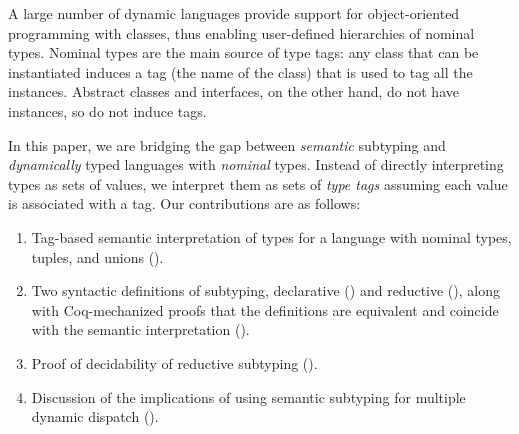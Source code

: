 A large number of dynamic languages provide support 
for object-oriented programming with classes, 
thus enabling user-defined hierarchies of nominal types.
Nominal types are the main source of type tags: 
any class that can be instantiated induces a tag (the name of the class) 
that is used to tag all the instances.
Abstract classes and interfaces, on the other hand, 
do not have instances, so do not induce tags.

In this paper, we are bridging the gap between \emph{semantic} subtyping 
and \emph{dynamically} typed languages with \emph{nominal} types.
Instead of directly interpreting types as sets of values,
we interpret them as sets of \emph{type tags} assuming 
each value is associated with a tag.
Our contributions are as follows:
\begin{enumerate}
  \item Tag-based semantic interpretation of types for a language
    with nominal types, tuples, and unions ().
  \item Two syntactic definitions of subtyping, 
    declarative () and reductive (),
    along with Coq-mechanized proofs that the definitions are equivalent
    and coincide with the semantic interpretation (). 	
  \item Proof of decidability of reductive subtyping ().
  \item Discussion of the implications of using semantic subtyping
    for multiple dynamic dispatch ().
\end{enumerate}






